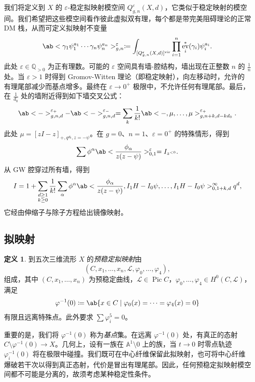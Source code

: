 \documentclass{amsart}
\theoremstyle{definition}
\newtheorem{defn}[thm]{定义}
\theoremstyle{remark}
\theoremstyle{plain}
\theoremstyle{definition}
\theoremstyle{remark}
\newcommand{\A}{\mathbb{A}}
\newcommand{\Q}{\mathbb{Q}}
\newcommand{\ep}{\varepsilon}
\newcommand{\mc}[1]{\mathcal{#1}}
\newcommand{\mr}[1]{\mathrm{#1}}
\newcommand{\1}{\mathbf{1}}
\newcommand{\2}{\mathbf{2}}
\newcommand{\3}{\mathbf{3}}
\newcommand{\vir}{\mr{vir}}
\DeclareMathOperator{\Pic}{Pic}
\DeclareMathOperator{\ev}{ev}
\begin{document}
我们将定义到 \(X\) 的 \(\ep\)-稳定拟映射模空间 \(Q_{g,n}^{\ep}(X, d)\)，它类似于稳定映射的模空间。我们希望把这些模空间看作彼此虚拟双有理，每个都是带完美阻碍理论的正常 DM 栈，从而可定义拟映射不变量
\[ \ab< \gamma_1 \psi_1^{a_1} \cdots \gamma_n \psi_n^{a_n}>_{g,n}^{\ep} \coloneqq \int_{[Q_{g,n}^{\ep}(X,d)]^{\vir}} \prod_{i=1}^n \ev_i^*(\gamma_i) \psi_i^{a_i}. \]
此处 \(\ep \in \Q_{>0}\) 为正有理数。可能的 \(\ep\) 空间具有墙-腔结构，墙出现在正整数 \(n\) 的 \(\frac{1}{n}\) 处。当 \(\ep > 1\) 时得到 Gromov-Witten 理论（即稳定映射），向左移动时，允许的有理尾部减少而基点增多。最终在 \(\ep \to 0^+\) 极限中，不允许任何有理尾部。最后，在 \(\frac{1}{d_0}\) 处的墙附近得到如下墙交叉公式：
\[ \ab<->_{g,n,d}^{\ep_+} - \ab<->_{g,n,d}^{\ep_-} = \sum_{k} \frac{1}{k!} \ab<-, \mu, \ldots, \mu>_{g,n+k, d-kd_0}^{\ep_+}. \]
此处 \(\mu = [zI-z]_{+, q^{d_0}, z=-\psi}\)。在 \(g = 0\)、\(n = 1\)、\(\ep = 0^+\) 的特殊情形，得到
\[ \sum \phi^{\alpha} \ab<\frac{\phi_{\alpha}}{z(z-\psi)}>^{\ep}_{0,1} = I_{z^{<0}}. \]
从 GW 腔穿过所有墙，得到
\[ I = 1 + \sum_{\substack{d \geq 1 \\ k \geq 0}} \frac{1}{k!} \sum_{\alpha} \phi^{\alpha} \ab< \frac{\phi_{\alpha}}{z(z-\psi)}, I_1 H - I_0 \psi, \ldots, I_1 H - I_0 \psi>_{0,1+k,d}^{\infty} q^d, \]
它经由伸缩子与除子方程给出镜像映射。

\subsection{拟映射}%
\label{sub:Quasimaps}

\begin{defn}
    到五次三维流形 \(X\) 的\textit{预稳定拟映射}由
    \[(C, x_1, \ldots, x_n, \mc{L}, \varphi_0, \ldots, \varphi_4),\]
    组成，其中 \((C, x_1, \ldots, x_n)\) 为预稳定曲线，\(\mc{L} \in \Pic C\)，\(\varphi_0, \ldots, \varphi_4 \in H^0(C, \mc{L})\)，满足
    \[ \varphi^{-1}(0) \coloneqq \ab\{x \in C \mid \varphi_0(x) = \cdots = \varphi_4(x) = 0 \} \]
    有限且远离特殊点。此外要求 \(\sum \varphi_i^5 = 0\)。
\end{defn}

重要的是，我们将 \(\varphi^{-1}(0)\) 称为\textit{基点}集。在远离 \(\varphi^{-1}(0)\) 处，有真正的态射 \(C \setminus \varphi^{-1}(0) \to X\)。几何上，设有一族在 \(\A^1 \setminus 0\) 上的族，当 \(t \to 0\) 时零点轨迹 \(\varphi_i^{-1}(0)\) 将在极限中碰撞。我们既可在中心纤维保留此拟映射，也可将中心纤维爆破若干次以得到真正态射，代价是冒出有理尾部。因此，任何预稳定拟映射模空间都不可能是分离的，故须考虑某种稳定性条件。
\end{document}
